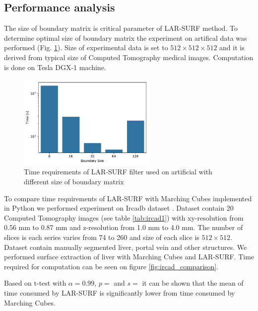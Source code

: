\documentclass[11pt, oneside]{amsart}   	%
\begin{document}
\subsection{Performance analysis}\label{sec:analysis}

The size of boundary matrix is critical parameter of LAR-SURF method. To determine optimal size of boundary matrix the experiment on artifical data was performed (Fig.  \ref{fig:bm_size_tesla}). Size of experimental data is set to $512\times512\times512$ and it is derived from typical size of Computed Tomography medical images. Computation is done on Tesla DGX-1 machine.

\begin{figure}
\centering
\includegraphics[width=0.6\textwidth]{figs/bm_size_tesla.pdf} 
\caption{Time requirements of LAR-SURF filter used on artificial with different size of boundary matrix}
\label{fig:bm_size_tesla}
\end{figure}



To compare time requirements of LAR-SURF with Marching Cubes implemented in Python we performed experiment on Ircadb dataset \cite{ircad}. Dataset contain 20 Computed Tomography images (see table \ref{tab:ircad1}) with xy-resolution from 0.56 mm to 0.87 mm and z-resolution from 1.0 mm to 4.0 mm. The number of slices is each series varies from 74 to 260 and size of each slice is $512\times512$. Dataset contain manually segmented liver, portal vein and other structures. We performed surface extraction of liver with Marching Cubes and LAR-SURF. Time required for computation can be seen on figure \ref{fig:ircad_comparison}. 

Based on t-test with $\alpha=0.99$, $p=$ and 
$s=$ it can be shown that the mean of time consumed by LAR-SURF is significantly lower from time consumed by Marching Cubes.
\end{document}
